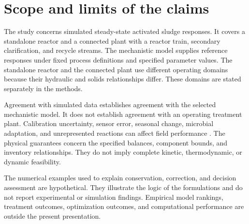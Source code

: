 \section{Scope and limits of the claims}

The study concerns simulated steady-state activated sludge responses. It covers a standalone reactor and a connected plant with a reactor train, secondary clarification, and recycle streams. The mechanistic model supplies reference responses under fixed process definitions and specified parameter values. The standalone reactor and the connected plant use different operating domains because their hydraulic and solids relationships differ. These domains are stated separately in the methods.

Agreement with simulated data establishes agreement with the selected mechanistic model. It does not establish agreement with an operating treatment plant. Calibration uncertainty, sensor error, seasonal change, microbial adaptation, and unrepresented reactions can affect field performance \citep{Machado2014,Newhart2019}. The physical guarantees concern the specified balances, component bounds, and inventory relationships. They do not imply complete kinetic, thermodynamic, or dynamic feasibility.

The numerical examples used to explain conservation, correction, and decision assessment are hypothetical. They illustrate the logic of the formulations and do not report experimental or simulation findings. Empirical model rankings, treatment outcomes, optimization outcomes, and computational performance are outside the present presentation.
